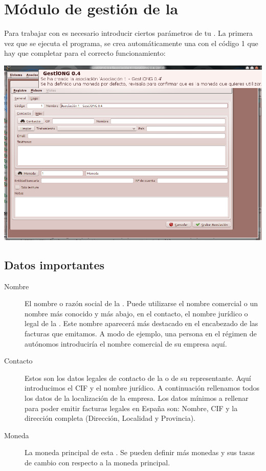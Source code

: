\chapter{Módulo de gestión de la \organizacion}
\label{chap:gestionorganizacion}

Para trabajar con \appname es necesario introducir ciertos parámetros de tu \organizacion. La primera vez que se ejecuta el programa, se crea automáticamente una \organizacion con el código 1 que hay que completar para el correcto funcionamiento:

\medskip

\noindent\includegraphics[width=\linewidth]{images/empresainicial.png}

\section{Datos importantes}

\begin{description}
 \item [Nombre] El nombre o razón social de la \organizacion. Puede utilizarse el nombre comercial o un nombre más conocido y más abajo, en el contacto, el nombre jurídico o legal de la \organizacion. Este nombre aparecerá más destacado en el encabezado de las facturas que emitamos. A modo de ejemplo, una persona en el régimen de autónomos introduciría el nombre comercial de su empresa aquí.
 \item [Contacto] Estos son los datos legales de contacto de la \organizacion o de su representante. Aquí introducimos el CIF y el nombre jurídico. A continuación rellenamos todos los datos de la localización de la empresa. Los datos mínimos a  rellenar para poder emitir facturas legales en España son: Nombre, CIF y la dirección completa (Dirección, Localidad y Provincia).
 \item [Moneda] La moneda principal de esta \organizacion. Se pueden definir más monedas y sus tasas de cambio con respecto a la moneda principal.
\end{description}


